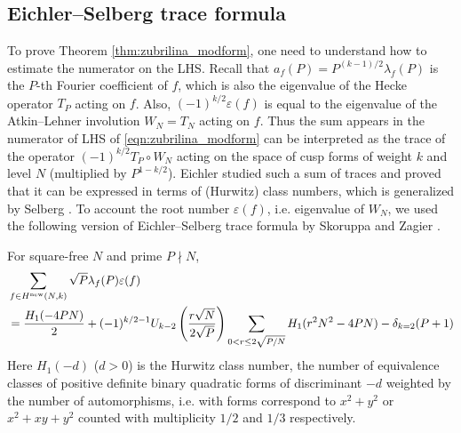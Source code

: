\subsection{Eichler--Selberg trace formula}

To prove Theorem \ref{thm:zubrilina_modform}, one need to understand how to estimate the numerator on the LHS.
Recall that $a_f(P) = P^{(k-1)/2} \lambda_f(P)$ is the $P$-th Fourier coefficient of $f$, which is also the eigenvalue of the Hecke operator $T_P$ acting on $f$.
Also, $(-1)^{k/2}\varepsilon(f)$ is equal to the eigenvalue of the Atkin--Lehner involution $W_N = T_N$ acting on $f$.
Thus the sum appears in the numerator of LHS of \eqref{eqn:zubrilina_modform} can be interpreted as the trace of the operator $(-1)^{k/2} T_P \circ W_N$ acting on the space of cusp forms of weight $k$ and level $N$ (multiplied by $P^{1 - k/2}$).
Eichler \cite{eichler1955class} studied such a sum of traces and proved that it can be expressed in terms of (Hurwitz) class numbers, which is generalized by Selberg \cite{selberg1956harmonic}.
To account the root number $\varepsilon(f)$, i.e. eigenvalue of $W_N$, we used the following version of Eichler--Selberg trace formula by Skoruppa and Zagier \cite{skoruppa1987jacobi}.

\begin{theorem}
    \label{thm:sz_tf}
    For square-free $N$ and prime $P \nmid N$,
    \begin{align*}
        &\sum_{f \in H^{\mathrm{new}}(N, k)} \sqrt{P} \lambda_f(P) \varepsilon(f)\nonumber \\
        &= \frac{H_1(-4PN)}{2} + (-1)^{k/2 - 1} U_{k - 2} \left(\frac{r\sqrt{N}}{2\sqrt{P}}\right) \sum_{0 < r \le 2\sqrt{P/N}} H_1(r^2 N^2 - 4PN) - \delta_{k=2}(P+1)
    \end{align*}
    Here $H_1(-d)$ ($d > 0$) is the Hurwitz class number, the number of equivalence classes of positive definite binary quadratic forms of discriminant $-d$ weighted by the number of automorphisms, i.e. with forms correspond to $x^2 + y^2$ or $x^2 + xy + y^2$ counted with multiplicity $1/2$ and $1/3$ respectively.
\end{theorem}

